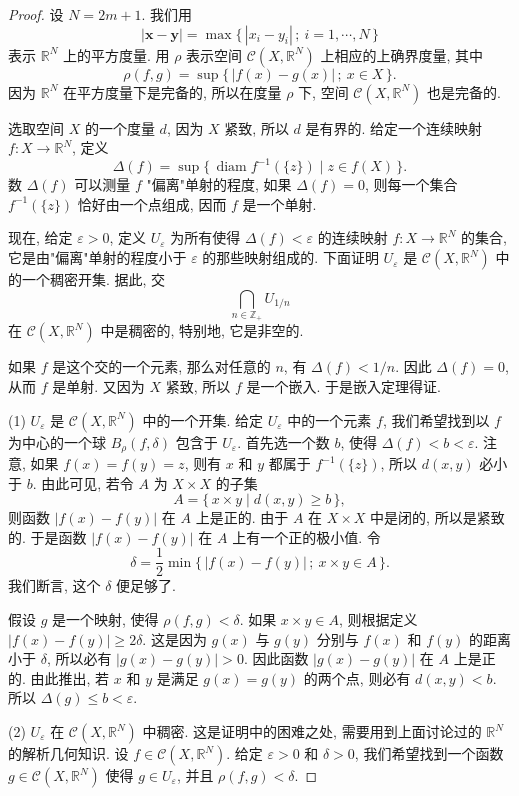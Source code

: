 \begin{proof}
设 $N=2m+1$. 我们用
\[
|\boldsymbol{x}-\boldsymbol{y}|=\max\{\,|x_{i}-y_{i}|\,;\ i=1,\cdots,N\,\}
\]
表示 $\mathbb{R}^{N}$ 上的平方度量. 用 $\rho$ 表示空间 $\mathcal{C}(X,\mathbb{R}^{N})$ 上相应的上确界度量, 其中
\[
\rho(f,g)=\sup\{\,|f(x)-g(x)|\,;\ x\in X\,\}.
\]
因为 $\mathbb{R}^{N}$ 在平方度量下是完备的, 所以在度量 $\rho$ 下, 空间 $\mathcal{C}(X,\mathbb{R}^{N})$ 也是完备的.

选取空间 $X$ 的一个度量 $d$, 因为 $X$ 紧致, 所以 $d$ 是有界的. 给定一个连续映射 $f\colon X\to\mathbb{R}^{N}$, 定义
\[
\Delta(f)=\sup\{\,\operatorname{diam}f^{-1}(\{z\})\mid z\in f(X)\,\}.
\]
数 $\Delta(f)$ 可以测量 $f$ "偏离"单射的程度, 如果 $\Delta(f)=0$, 则每一个集合 $f^{-1}(\{z\})$ 恰好由一个点组成, 因而 $f$ 是一个单射.

现在, 给定 $\varepsilon>0$, 定义 $U_\varepsilon$ 为所有使得 $\Delta(f)<\varepsilon$ 的连续映射 $f\colon X\to\mathbb{R}^{N}$ 的集合, 它是由"偏离"单射的程度小于 $\varepsilon$ 的那些映射组成的. 下面证明 $U_\varepsilon$ 是 $\mathcal{C}(X,\mathbb{R}^{N})$ 中的一个稠密开集. 据此, 交
\[
\bigcap_{n\in\mathbb{Z}_{+}}U_{1/n}
\]
在 $\mathcal{C}(X,\mathbb{R}^{N})$ 中是稠密的, 特别地, 它是非空的.

如果 $f$ 是这个交的一个元素, 那么对任意的 $n$, 有 $\Delta(f)<1/n$. 因此 $\Delta(f)=0$, 从而 $f$ 是单射. 又因为 $X$ 紧致, 所以 $f$ 是一个嵌入. 于是嵌入定理得证.

(1) $U_\varepsilon$ 是 $\mathcal{C}(X,\mathbb{R}^{N})$ 中的一个开集. 给定 $U_\varepsilon$ 中的一个元素 $f$, 我们希望找到以 $f$ 为中心的一个球 $B_\rho(f,\delta)$ 包含于 $U_\varepsilon$. 首先选一个数 $b$, 使得 $\Delta(f)<b<\varepsilon$. 注意, 如果 $f(x)=f(y)=z$, 则有 $x$ 和 $y$ 都属于 $f^{-1}(\{z\})$, 所以 $d(x,y)$ 必小于 $b$. 由此可见, 若令 $A$ 为 $X\times X$ 的子集
\[
A=\{\,x\times y\mid d(x,y)\geqslant b\,\},
\]
则函数 $|f(x)-f(y)|$ 在 $A$ 上是正的. 由于 $A$ 在 $X\times X$ 中是闭的, 所以是紧致的. 于是函数 $|f(x)-f(y)|$ 在 $A$ 上有一个正的极小值. 令
\[
\delta=\frac{1}{2}\min\{\,|f(x)-f(y)|\,;\ x\times y\in A\,\}.
\]
我们断言, 这个 $\delta$ 便足够了.

假设 $g$ 是一个映射, 使得 $\rho(f,g)<\delta$. 如果 $x\times y\in A$, 则根据定义 $|f(x)-f(y)|\geqslant 2\delta$. 这是因为 $g(x)$ 与 $g(y)$ 分别与 $f(x)$ 和 $f(y)$ 的距离小于 $\delta$, 所以必有 $|g(x)-g(y)|>0$. 因此函数 $|g(x)-g(y)|$ 在 $A$ 上是正的. 由此推出, 若 $x$ 和 $y$ 是满足 $g(x)=g(y)$ 的两个点, 则必有 $d(x,y)<b$. 所以 $\Delta(g)\leqslant b<\varepsilon$.

(2) $U_\varepsilon$ 在 $\mathcal{C}(X,\mathbb{R}^{N})$ 中稠密. 这是证明中的困难之处, 需要用到上面讨论过的 $\mathbb{R}^{N}$ 的解析几何知识. 设 $f\in\mathcal{C}(X,\mathbb{R}^{N})$. 给定 $\varepsilon>0$ 和 $\delta>0$, 我们希望找到一个函数 $g\in\mathcal{C}(X,\mathbb{R}^{N})$ 使得 $g\in U_\varepsilon$, 并且 $\rho(f,g)<\delta$.


\end{proof}
